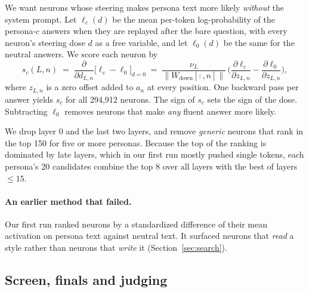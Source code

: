 \documentclass[11pt]{article}
\newcommand{\dose}{d}
\newcommand{\wdown}{W_{\text{down}}}
\begin{document}
We want neurons whose steering makes persona text more likely \emph{without} the system prompt. Let $\ell_c(\dose)$ be the mean per-token log-probability of the persona-$c$ answers when they are replayed after the bare question, with every neuron's steering dose $\dose$ as a free variable, and let $\ell_0(\dose)$ be the same for the neutral answers. We score each neuron by
\begin{equation}
s_c(L,n) \;=\; \frac{\partial}{\partial \dose_{L,n}}\Big[\ell_c - \ell_0\Big]_{\dose=0}
\;=\; \frac{\nu_L}{\lVert\wdown[:,n]\rVert}\,\Big(\frac{\partial \ell_c}{\partial z_{L,n}} - \frac{\partial \ell_0}{\partial z_{L,n}}\Big),
\label{eq:attr}
\end{equation}
where $z_{L,n}$ is a zero offset added to $a_n$ at every position. One backward pass per answer yields $s_c$ for all 294,912 neurons. The sign of $s_c$ sets the sign of the dose. Subtracting $\ell_0$ removes neurons that make \emph{any} fluent answer more likely.

We drop layer 0 and the last two layers, and remove \emph{generic} neurons that rank in the top 150 for five or more personas. Because the top of the ranking is dominated by late layers, which in our first run mostly pushed single tokens, each persona's 20 candidates combine the top 8 over all layers with the best of layers $\le 15$.

\paragraph{An earlier method that failed.} Our first run ranked neurons by a standardized difference of their mean activation on persona text against neutral text. It surfaced neurons that \emph{read} a style rather than neurons that \emph{write} it (Section~\ref{sec:search}).

\subsection{Screen, finals and judging}
\end{document}
